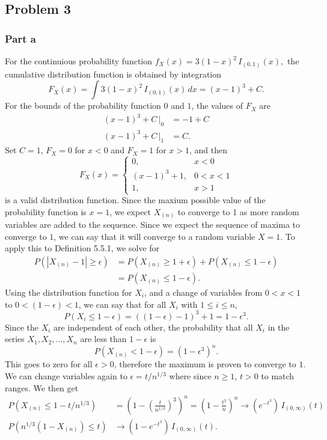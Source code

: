 \documentclass{article}
\begin{document}
\subsection*{Problem 3}
\subsubsection*{Part a}
For the continuious probability function $f_X(x) = 3(1-x)^2\,I_{(0,1)}(x),$ the cumulative distribution function is obtained by integration \[F_X(x) = \int 3(1-x)^2\,I_{(0,1)}(x)\,dx = (x-1)^3 + C.\] For the bounds of the probability function $0$ and $1$, the values of $F_X$ are 
\[\begin{aligned}
(x-1)^3 + C\,\big|_0 &= -1 + C \\
(x-1)^3 + C\,\big|_1 &= C.
\end{aligned}\]
Set $C = 1$, $F_X = 0$ for $x < 0$ and $F_X = 1$ for $x > 1$, and then 
\[F_X(x) = \begin{cases}
0, &x<0\\
(x-1)^3 + 1, & 0<x<1 \\
1, &x>1\end{cases}\] is a valid distribution function. Since the maxium possible value of the probability function is $x=1$, we expect $X_{(n)}$ to converge to 1 as more random variables are added to the sequence. Since we expect the sequence of maxima to converge to $1$, we can say that it will converge to a random variable $X=1$. To apply this to Definition 5.5.1, we solve for 
\[\begin{aligned}
P\left(\left|X_{(n)}-1\right|\geq\epsilon\right) &= P\left(X_{(n)}\geq 1+\epsilon\right) + P\left(X_{(n)} \leq 1 - \epsilon\right) \\
&=  P\left(X_{(n)} \leq 1 - \epsilon\right).
\end{aligned}\]
Using the distribution function for $X_i$, and a change of variables from $0 < x < 1$ to $0 < (1-\epsilon) < 1$, we can say that for all $X_i$ with $1\leq i\leq n$,
\[ P(X_i \leq 1 - \epsilon) = \left((1-\epsilon)-1\right)^3+1 = 1 - \epsilon^3.\]
Since the $X_i$ are independent of each other, the probability that all $X_i$ in the series $X_1, X_2, ... , X_n$ are less than $1-\epsilon$ is \[P\left(X_{(n)} < 1 - \epsilon\right) = \left(1-\epsilon^3\right)^n.\] This goes to zero for all $\epsilon > 0$, therefore the maximum is proven to converge to $1$. We can change variables again to $\epsilon = t/n^{1/3}$ where since $n \geq 1$, $t > 0$ to match ranges. We then get
\[\begin{aligned}
P\left(X_{(n)} \leq 1 - t/n^{1/3}\right) &= \left(1-\left(\frac{t}{n^{1/3}}\right)^3\right)^n = \left(1-\frac{t^3}{n}\right)^n \to \left(e^{-t^3}\right)\, I_{(0,\infty)}(t) \\
P\left(n^{1/3}\left(1-X_{(n)}\right)\leq t\right) &\to \left(1 - e^{-t^3}\right)\,I_{(0,\infty)}(t).
\end{aligned}\]
\end{document}
